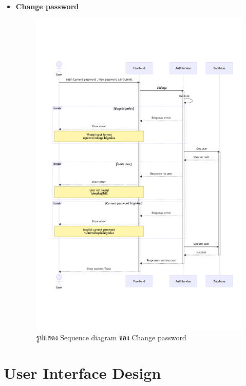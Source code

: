 \documentclass[12pt,oneside,openright,a4paper]{cpe-thai-project}
\begin{document}
\begin{itemize}
        
    \newpage
    \item \textbf{Change password}\\
    \begin{figure}[!ht]\centering
        \includegraphics[width=13cm, trim={0 5cm 0 5cm},clip]{./assets/sequence-diagram/change-password.png}
        \caption{รูปแสดง Sequence diagram ของ Change password}\label{fig:sqChangePassword}
    \end{figure}

    
\end{itemize}
\newpage
\section{User Interface Design}
\end{document}
